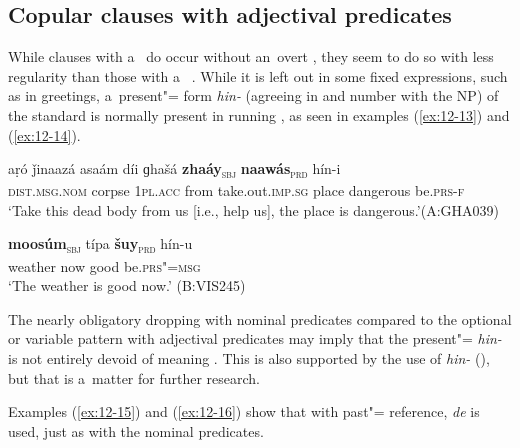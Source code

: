 \subsection{Copular clauses with adjectival predicates}
\label{subsec:12-1-2}


While clauses with a~   do occur without an~overt , they seem to do so with less regularity than those with a~  . While it is left out in some fixed expressions, such as in greetings, a~present"= form \textit{hin-} (agreeing in  and number with the NP) of the standard  is normally present in running , as seen in examples (\ref{ex:12-13}) and (\ref{ex:12-14}). 

\begin{exe}
\ex
\label{ex:12-13}
\gll aṛó ǰinaazá asaám díi ɡhašá {\ob}\textbf{zhaáy}{\cb}\textsubscript{\textsc{\upshape sbj}} {\ob}\textbf{naawás}{\cb}\textsubscript{\textsc{\upshape prd}} hín-i\\
\textsc{dist.msg.nom} corpse \textsc{1pl.acc} from take.out.\textsc{imp.sg}  place dangerous be.\textsc{prs-f} \\
\glt `Take this dead body from us [i.e., help us], the place is dangerous.'\newline (A:GHA039)
\end{exe}
\begin{exe}
\ex
\label{ex:12-14}
\gll {\ob}\textbf{moosúm}{\cb}\textsubscript{\textsc{\upshape sbj}} típa {\ob}\textbf{šuy}{\cb}\textsubscript{\textsc{\upshape prd}} hín-u\\
weather now good be.\textsc{prs"=msg}\\
\glt `The weather is good now.' (B:VIS245)
\end{exe}

The nearly obligatory  dropping with nominal predicates compared to the optional or variable pattern with adjectival predicates may imply that the present"=  \textit{hin-} is not entirely devoid of meaning \citep[8, 31, 66]{pustet2003}. This is also supported by the  use of \textit{hin-} (), but that is a~matter for further research.



Examples (\ref{ex:12-15}) and (\ref{ex:12-16}) show that with past"= reference, \textit{de} is used, just as with the nominal predicates.

